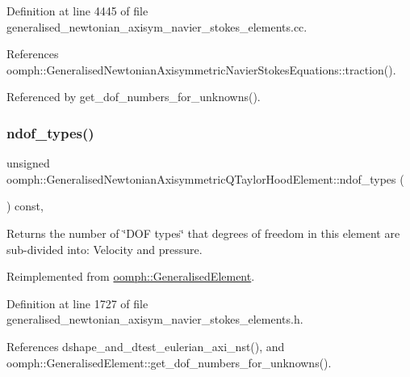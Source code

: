 Definition at line 4445 of file generalised\+\_\+newtonian\+\_\+axisym\+\_\+navier\+\_\+stokes\+\_\+elements.\+cc.



References oomph\+::\+Generalised\+Newtonian\+Axisymmetric\+Navier\+Stokes\+Equations\+::traction().



Referenced by get\+\_\+dof\+\_\+numbers\+\_\+for\+\_\+unknowns().

\mbox{\label{classoomph_1_1GeneralisedNewtonianAxisymmetricQTaylorHoodElement_a4327576642aa78c8aadc175f44c85c17}} 
\subsubsection{\texorpdfstring{ndof\+\_\+types()}{ndof\_types()}}
{\footnotesize\ttfamily unsigned oomph\+::\+Generalised\+Newtonian\+Axisymmetric\+Q\+Taylor\+Hood\+Element\+::ndof\+\_\+types (\begin{DoxyParamCaption}{ }\end{DoxyParamCaption}) const\hspace{0.3cm}{\ttfamily [inline]}, {\ttfamily [virtual]}}



Returns the number of \char`\"{}\+D\+O\+F types\char`\"{} that degrees of freedom in this element are sub-\/divided into\+: Velocity and pressure. 



Reimplemented from \hyperlink{classoomph_1_1GeneralisedElement_a0c6037a870597b35dcf1c780710b9a56}{oomph\+::\+Generalised\+Element}.



Definition at line 1727 of file generalised\+\_\+newtonian\+\_\+axisym\+\_\+navier\+\_\+stokes\+\_\+elements.\+h.



References dshape\+\_\+and\+\_\+dtest\+\_\+eulerian\+\_\+axi\+\_\+nst(), and oomph\+::\+Generalised\+Element\+::get\+\_\+dof\+\_\+numbers\+\_\+for\+\_\+unknowns().

